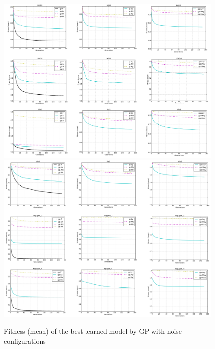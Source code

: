 \begin{figure}
  \includegraphics[width=1.0\textwidth]{Figures/Figure4.png}
  \includegraphics[width=1.0\textwidth]{Figures/Figure5.png}
\caption{Fitness (mean) of the best learned model by GP with noise configurations}
\label{fig:Fitness}       %
\end{figure}
